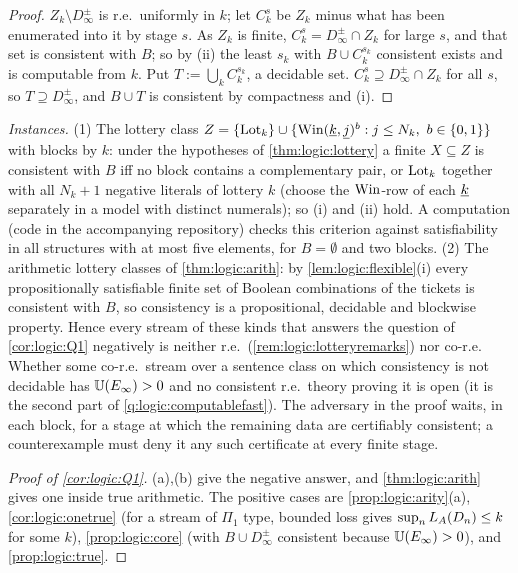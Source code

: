 \begin{proof}
$Z_k\setminus D_\infty^\pm$ is r.e.\ uniformly in $k$; let $C^s_k$ be $Z_k$ minus what has been enumerated into it by stage $s$. As $Z_k$ is finite, $C^s_k=D_\infty^\pm\cap Z_k$ for large $s$, and that set is consistent with $B$; so by (ii) the least $s_k$ with $B\cup C^{s_k}_k$ consistent exists and is computable from $k$. Put $T:=\bigcup_kC^{s_k}_k$, a decidable set. $C^s_k\supseteq D_\infty^\pm\cap Z_k$ for all $s$, so $T\supseteq D_\infty^\pm$, and $B\cup T$ is consistent by compactness and (i).
\end{proof}

\emph{Instances.} (1) The lottery class $Z=\{\Lot_k\}\cup\{\Win(\num k,\num j)^b:j\le N_k,\ b\in\{0,1\}\}$ with blocks by $k$: under the hypotheses of \cref{thm:logic:lottery} a finite $X\subseteq Z$ is consistent with $B$ iff no block contains a complementary pair, or $\mathrm{Lot}_k$ together with all $N_k+1$ negative literals of lottery $k$ (choose the $\mathrm{Win}$-row of each $\underline{k}$ separately in a model with distinct numerals); so (i) and (ii) hold. A computation (code in the accompanying repository) checks this criterion against satisfiability in all structures with at most five elements, for $B=\emptyset$ and two blocks. (2) The arithmetic lottery classes of \cref{thm:logic:arith}: by \cref{lem:logic:flexible}(i) every propositionally satisfiable finite set of Boolean combinations of the tickets is consistent with $B$, so consistency is a propositional, decidable and blockwise property. Hence every stream of these kinds that answers the question of \cref{cor:logic:Q1} negatively is neither r.e.\ (\cref{rem:logic:lotteryremarks}) nor co-r.e. Whether some co-r.e.\ stream over a sentence class on which consistency is not decidable has $\mathbb{U}(E_\infty)>0$ and no consistent r.e.\ theory proving it is open (it is the second part of \cref{q:logic:computablefast}). The adversary in the proof waits, in each block, for a stage at which the remaining data are certifiably consistent; a counterexample must deny it any such certificate at every finite stage.

\begin{proof}[Proof of \cref{cor:logic:Q1}]
(a),(b) give the negative answer, and \cref{thm:logic:arith} gives one inside true arithmetic. The positive cases are \cref{prop:logic:arity}(a), \cref{cor:logic:onetrue} (for a stream of $\Pi_1$ type, bounded loss gives $\sup_nL_{A}(D_n)\le k$ for some $k$), \cref{prop:logic:core} (with $B\cup D_\infty^\pm$ consistent because $\mathbb{U}(E_\infty)>0$), and \cref{prop:logic:true}.
\end{proof}

